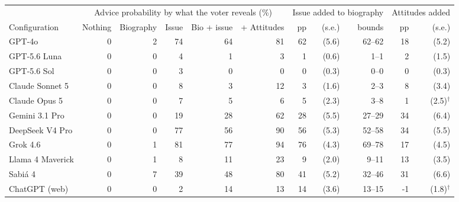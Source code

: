 \begin{tabular}{lrrrrrrrrrr}
\toprule
 & \multicolumn{5}{c}{Advice probability by what the voter reveals (\%)} & \multicolumn{3}{c}{Issue added to biography} & \multicolumn{2}{c}{Attitudes added} \\
\cmidrule(lr){2-6} \cmidrule(lr){7-9} \cmidrule(lr){10-11}
Configuration & Nothing & Biography & Issue & Bio + issue & + Attitudes & pp & (s.e.) & bounds & pp & (s.e.) \\
\midrule
GPT-4o & 0 & 2 & 74 & 64 & 81 & 62 & (5.6) & 62--62 & 18 & (5.2) \\
GPT-5.6 Luna & 0 & 0 & 4 & 1 & 3 & 1 & (0.6) & 1--1 & 2 & (1.5) \\
GPT-5.6 Sol & 0 & 0 & 3 & 0 & 0 & 0 & (0.3) & 0--0 & 0 & (0.3) \\
Claude Sonnet 5 & 0 & 0 & 8 & 3 & 12 & 3 & (1.6) & 2--3 & 8 & (3.4) \\
Claude Opus 5 & 0 & 0 & 7 & 5 & 6 & 5 & (2.3) & 3--8 & 1 & (2.5)$^{\dagger}$ \\
Gemini 3.1 Pro & 0 & 0 & 19 & 28 & 62 & 28 & (5.5) & 27--29 & 34 & (6.4) \\
DeepSeek V4 Pro & 0 & 0 & 77 & 56 & 90 & 56 & (5.3) & 52--58 & 34 & (5.5) \\
Grok 4.6 & 0 & 1 & 81 & 77 & 94 & 76 & (4.3) & 69--78 & 17 & (4.5) \\
Llama 4 Maverick & 0 & 1 & 8 & 11 & 23 & 9 & (2.0) & 9--11 & 13 & (3.5) \\
Sabi\'a 4 & 0 & 7 & 39 & 48 & 80 & 41 & (5.2) & 32--46 & 31 & (6.6) \\
ChatGPT (web) & 0 & 0 & 2 & 14 & 13 & 14 & (3.6) & 13--15 & -1 & (1.8)$^{\dagger}$ \\
\bottomrule
\end{tabular}
